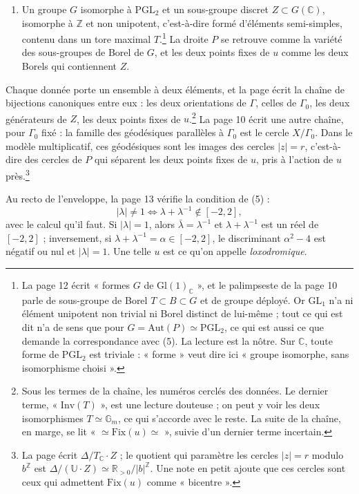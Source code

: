 \documentclass[11pt,a4paper]{article}
\begin{document}
\begin{enumerate}
  $u$ est l'homothétie de rapport $b$ ou $b^{-1}$.
  \item Un groupe $G$ isomorphe à $\mathrm{PGL}_2$ et un sous-groupe discret
  $Z \subset G(\mathbb{C})$, isomorphe à $\mathbb{Z}$ et non unipotent,
  c'est-à-dire formé d'éléments semi-simples, contenu dans un tore maximal
  $T$.\footnote{La page 12 écrit « formes $G$ de $\mathrm{Gl}(1)_{\mathbb{C}}$ »,
  et le palimpseste de la page 10 parle de sous-groupe de Borel
  $T \subset B \subset G$ et de groupe déployé. Or $\mathrm{GL}_1$ n'a ni
  élément unipotent non trivial ni Borel distinct de lui-même ; tout ce qui
  est dit n'a de sens que pour $G = \mathrm{Aut}(P) \simeq \mathrm{PGL}_2$,
  ce qui est aussi ce que demande la correspondance avec (5). La lecture est
  la nôtre. Sur $\mathbb{C}$, toute forme de $\mathrm{PGL}_2$ est triviale :
  « forme » veut dire ici « groupe isomorphe, sans isomorphisme choisi ».}
  La droite $P$ se retrouve comme la variété des sous-groupes de Borel de
  $G$, et les deux points fixes de $u$ comme les deux Borels qui contiennent
  $Z$.
\end{enumerate}

Chaque donnée porte un ensemble à deux éléments, et la page écrit la chaîne
de bijections canoniques entre eux : les deux orientations de $\Gamma$, celles
de $\Gamma_0$, les deux générateurs de $Z$, les deux points fixes de
$u$.\footnote{Sous les termes de la chaîne, les numéros cerclés des données.
Le dernier terme, « $\mathrm{Inv}(T)$ », est une lecture douteuse ; on peut y
voir les deux isomorphismes $T \simeq \mathbb{G}_m$, ce qui s'accorde avec le
reste. La suite de la chaîne, en marge, se lit « $\simeq \mathrm{Fix}(u) \simeq$ », suivie d'un dernier terme incertain.} La page 10 écrit une autre
chaîne, pour $\Gamma_0$ fixé : la famille des géodésiques parallèles à
$\Gamma_0$ est le cercle $X/\Gamma_0$. Dans le modèle multiplicatif, ces
géodésiques sont les images des cercles $|z| = r$, c'est-à-dire des cercles
de $P$ qui séparent les deux points fixes de $u$, pris à l'action de $u$
près.\footnote{La page écrit $\Delta/T_{\mathbb{C}}\cdot Z$ ; le quotient qui
paramètre les cercles $|z| = r$ modulo $b^{\mathbb{Z}}$ est
$\Delta/(\mathbb{U}\cdot Z) \simeq \mathbb{R}_{>0}/|b|^{\mathbb{Z}}$. Une
note en petit ajoute que ces cercles sont ceux qui admettent
$\mathrm{Fix}(u)$ comme « bicentre ».}

Au recto de l'enveloppe, la page 13 vérifie la condition de (5) :
\[
|\lambda| \neq 1 \iff \lambda + \lambda^{-1} \notin [-2, 2],
\]
avec le calcul qu'il faut. Si $|\lambda| = 1$, alors $\bar\lambda =
\lambda^{-1}$ et $\lambda + \lambda^{-1}$ est un réel de $[-2,2]$ ;
inversement, si $\lambda + \lambda^{-1} = \alpha \in [-2,2]$, le discriminant
$\alpha^2 - 4$ est négatif ou nul et $|\lambda| = 1$. Une telle $u$ est ce
qu'on appelle \emph{loxodromique}.
\end{document}
